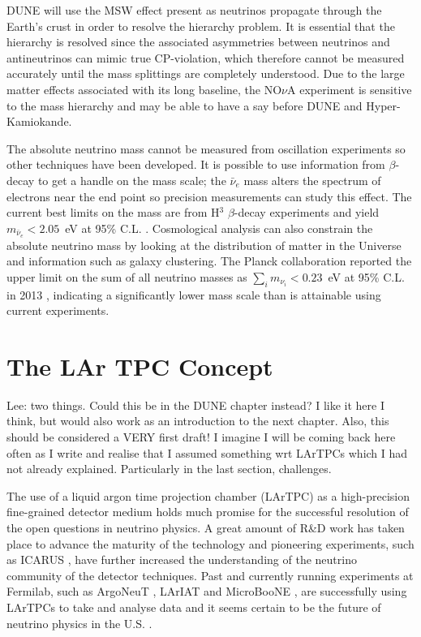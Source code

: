 DUNE will use the MSW effect present as neutrinos propagate through the Earth's crust in order to resolve the hierarchy problem.  It is essential that the hierarchy is resolved since the associated asymmetries between neutrinos and antineutrinos can mimic true CP-violation, which therefore cannot be measured accurately until the mass splittings are completely understood.  Due to the large matter effects associated with its long baseline, the NO$\nu$A experiment is sensitive to the mass hierarchy and may be able to have a say before DUNE and Hyper-Kamiokande.

The absolute neutrino mass cannot be measured from oscillation experiments so other techniques have been developed.  It is possible to use information from $\beta$-decay to get a handle on the mass scale; the $\bar{\nu}_e$ mass alters the spectrum of electrons near the end point so precision measurements can study this effect.  The current best limits on the mass are from H$^3$ $\beta$-decay experiments and yield $m_{\bar{\nu}_e} < 2.05$~eV at 95\% C.L. \cite{Triotsk2011,Mainz2005}.  Cosmological analysis can also constrain the absolute neutrino mass by looking at the distribution of matter in the Universe and information such as galaxy clustering.  The Planck collaboration reported the upper limit on the sum of all neutrino masses as $\sum_i m_{\nu_i} < 0.23$~eV at 95\% C.L. in 2013 \cite{Planck2013}, indicating a significantly lower mass scale than is attainable using current experiments.

\section{The LAr TPC Concept}\label{sec:LArTPC}

{\color{red} Lee: two things.  Could this be in the DUNE chapter instead?  I like it here I think, but would also work as an introduction to the next chapter.  Also, this should be considered a VERY first draft!  I imagine I will be coming back here often as I write and realise that I assumed something wrt LArTPCs which I had not already explained.  Particularly in the last section, challenges.}

The use of a liquid argon time projection chamber (LArTPC) as a high-precision fine-grained detector medium holds much promise for the successful resolution of the open questions in neutrino physics.  A great amount of R\&D work has taken place to advance the maturity of the technology and pioneering experiments, such as ICARUS \cite{ICARUS2004}, have further increased the understanding of the neutrino community of the detector techniques.  Past and currently running experiments at Fermilab, such as ArgoNeuT \cite{ArgoNeuT2012}, LArIAT \cite{LArIAT2014} and MicroBooNE \cite{MicroBooNE2017}, are successfully using LArTPCs to take and analyse data and it seems certain to be the future of neutrino physics in the U.S. \cite{Baller2014}.


